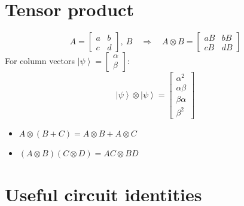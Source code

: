\documentclass[11pt,a4paper]{article}
\renewcommand{\ket}[1]{\left|#1\right\rangle}
\begin{document}
\section{Tensor product}

\[
A = \begin{bmatrix} a & b\\ c & d\end{bmatrix},\ B
\quad\Rightarrow\quad
A\otimes B = \begin{bmatrix} aB & bB\\ cB & dB\end{bmatrix}
\]
For column vectors $\ket{\psi} = \begin{bmatrix}\alpha\\ \beta\end{bmatrix}$:
\[
\ket{\psi}\otimes\ket{\psi} = \begin{bmatrix}\alpha^2\\ \alpha\beta\\ \beta\alpha\\ \beta^2\end{bmatrix}
\]
\begin{itemize}
  \item $A\otimes(B+C) = A\otimes B + A\otimes C$
  \item $(A\otimes B)(C\otimes D) = AC\otimes BD$
\end{itemize}

\section{Useful circuit identities}
\end{document}
